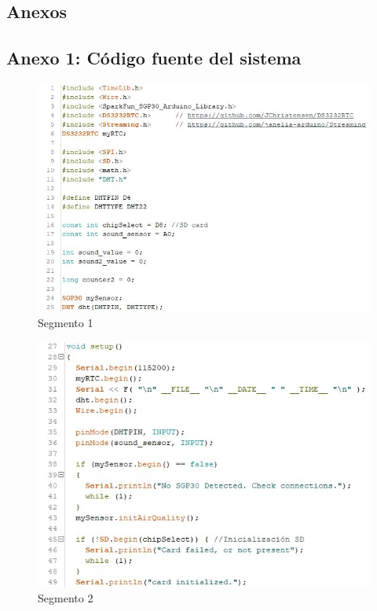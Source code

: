 \begin{center}
    \section*{\LARGE Anexos}    
\end{center}

\subsection*{Anexo 1: Código fuente del sistema}\label{Anexo1}

\begin{flushleft}
    \begin{figure}[H]
        \includegraphics{imagenes/codigo1.jpg}
        \caption*{Segmento 1}
    \end{figure}
    
    \begin{figure}[H]
        \includegraphics{imagenes/codigo2.jpg}
        \caption*{Segmento 2}
    \end{figure}
    

\end{flushleft}

